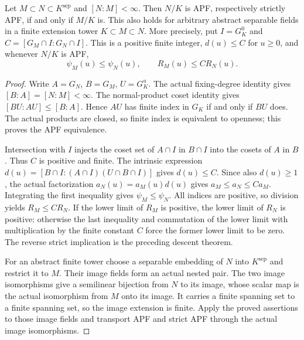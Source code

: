 \begin{proposition}
\label{fw:apf-finite-extension}
\leanok
Let $M\subset N\subset K^{\mathrm{sep}}$ and $[N:M]<\infty$.
Then $N/K$ is APF, respectively strictly APF, if and only if $M/K$ is.
This also holds for arbitrary abstract separable fields in a finite
extension tower $K\subset M\subset N$.
More precisely, put $I=G_K^0$ and
$C=[G_M\cap I:G_N\cap I]$. This is a positive finite integer,
$d(u)\leq C$ for $u\geq0$, and whenever $N/K$ is APF,
\[
 \psi_M(u)\leq\psi_N(u),\qquad R_M(u)\leq C R_N(u).
\]
\end{proposition}
\begin{proof}
Write $A=G_N$, $B=G_M$, $U=G_K^u$. The actual fixing-degree identity
gives $[B:A]=[N:M]<\infty$. The normal-product coset identity gives
$[BU:AU]\leq[B:A]$. Hence $AU$ has finite index in $G_K$ if and only
if $BU$ does. The actual products are closed, so finite index is
equivalent to openness; this proves the APF equivalence.

Intersection with $I$ injects the coset set of $A\cap I$ in
$B\cap I$ into the cosets of $A$ in $B$. Thus $C$ is positive and
finite. The intrinsic expression
$d(u)=[B\cap I:(A\cap I)(U\cap B\cap I)]$ gives $d(u)\leq C$.
Since also $d(u)\geq1$, the actual factorization
$a_N(u)=a_M(u)d(u)$ gives $a_M\leq a_N\leq C a_M$.
Integrating the first inequality gives $\psi_M\leq\psi_N$.
All indices are positive, so division yields
$R_M\leq C R_N$. If the lower limit of $R_M$ is positive, the lower
limit of $R_N$ is positive: otherwise the last inequality and
commutation of the lower limit with multiplication by the finite
constant $C$ force the former lower limit to be zero. The reverse
strict implication is the preceding descent theorem.

For an abstract finite tower choose a separable embedding of $N$ into
$K^{\mathrm{sep}}$ and restrict it to $M$. Their image fields form an
actual nested pair. The two image isomorphisms give a semilinear
bijection from $N$ to its image, whose scalar map is the actual
isomorphism from $M$ onto its image. It carries a finite spanning set
to a finite spanning set, so the image extension is finite.
Apply the proved assertions to those image fields and transport APF
and strict APF through the actual image isomorphisms.
\end{proof}

